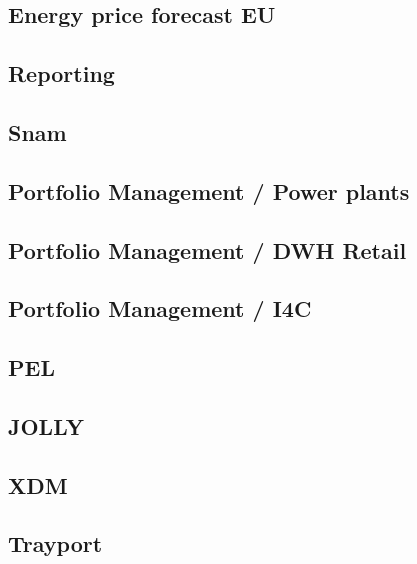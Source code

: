 
\subsection{Energy price forecast EU}
    
\subsection{Reporting}
    
\subsection{Snam}
    
\subsection{Portfolio Management / Power plants}
    
\subsection{Portfolio Management / DWH Retail}
    
\subsection{Portfolio Management / I4C}
    
\subsection{PEL}
    
\subsection{JOLLY}
    
\subsection{XDM}
    
\subsection{Trayport}
    